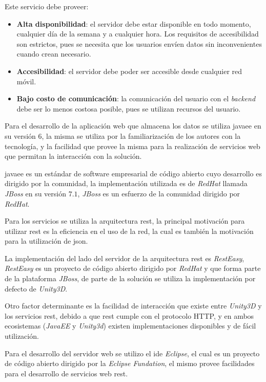 Este servicio debe proveer:

\begin{itemize}
    \item \textbf{Alta disponibilidad}: el servidor debe estar disponible en
        todo momento, cualquier día de la semana y a cualquier hora. Los
        requisitos de accesibilidad son estrictos, pues se necesita que los
        usuarios envíen datos sin inconvenientes cuando crean necesario.
    \item \textbf{Accesibilidad}: el servidor debe poder ser accesible desde
        cualquier red móvil.
    \item \textbf{Bajo costo de comunicación}: la comunicación del usuario con
        el \textit{backend} debe ser lo menos costosa posible, pues se utilizan
        recursos del usuario.
\end{itemize}

Para el desarrollo de la aplicación web que almacena los datos se utiliza
\Gls{javaee} en su versión $6$, la misma se utiliza por la familiarización de
los autores con la tecnología, y la facilidad que provee la misma para la
realización de servicios web que permitan la interacción con la solución.

\Gls{javaee} es un estándar de software empresarial de código abierto cuyo
desarrollo es dirigido por la comunidad\cite{javaee}, la implementación
utilizada es de \textit{RedHat} llamada \textit{JBoss} en su versión $7.1$,
\textit{JBoss} es un esfuerzo de la comunidad dirigido por \textit{RedHat}. 

Para los servicios se utiliza la arquitectura \Gls{rest}, la principal
motivación para utilizar \Gls{rest} es la eficiencia en el uso de la
red\cite{pautasso2008restful}, la cual es también la motivación para la
utilización de \Gls{json}. 

La implementación del lado del servidor de la arquitectura \Gls{rest} es
\textit{RestEasy}, \textit{RestEasy} es un proyecto de código abierto dirigido
por \textit{RedHat} y que forma parte de la plataforma \textit{JBoss}, de parte
de la solución se utiliza la implementación por defecto de \textit{Unity3D}.

Otro factor determinante es la facilidad de interacción que existe entre
\textit{Unity3D} y los servicios \Gls{rest}, debido a que \Gls{rest} cumple con
el protocolo HTTP, y en ambos ecosistemas (\textit{JavaEE} y \textit{Unity3d})
existen implementaciones disponibles y de fácil utilización.

Para el desarrollo del servidor web se utilizo el \Gls{ide} \textit{Eclipse}, el
cual es un proyecto de código abierto dirigido por la \textit{Eclipse
    Fundation}\cite{eclipse}, el mismo provee facilidades para el desarrollo de
servicios web \Gls{rest}.

